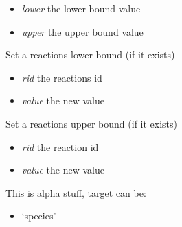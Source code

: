 \documentclass[a4paper,11pt,english]{sphinxmanual}
\begin{document}
\begin{fulllineitems}
\begin{fulllineitems}
\begin{itemize}
\item {} 
\emph{lower} the lower bound value

\item {} 
\emph{upper} the upper bound value

\end{itemize}

\end{fulllineitems}


\begin{fulllineitems}
\label{modules_doc:cbmpy.CBModel.Model.setReactionLowerBound}
Set a reactions lower bound (if it exists)
\begin{itemize}
\item {} 
\emph{rid} the reactions id

\item {} 
\emph{value} the new value

\end{itemize}

\end{fulllineitems}


\begin{fulllineitems}
\label{modules_doc:cbmpy.CBModel.Model.setReactionUpperBound}
Set a reactions upper bound (if it exists)
\begin{itemize}
\item {} 
\emph{rid} the reaction id

\item {} 
\emph{value} the new value

\end{itemize}

\end{fulllineitems}


\begin{fulllineitems}
\label{modules_doc:cbmpy.CBModel.Model.setSuffix}
This is alpha stuff, target can be:
\begin{itemize}
\item {} 
`species'


\end{itemize}
\end{fulllineitems}
\end{fulllineitems}
\end{document}
